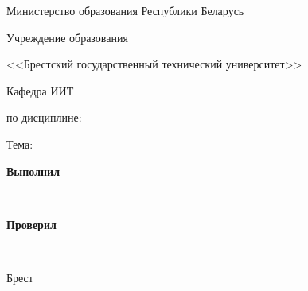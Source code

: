 \begin{center}
    Министерство образования Республики Беларусь

    Учреждение образования

    <<Брестский государственный технический университет>>

    Кафедра ИИТ
\end{center}

\vfill

\begin{center}
    \titlePageTypeWork

    по дисциплине: {\bfseries\titlePageSubject}

    Тема: \titlePageTopic
\end{center}

\vfill

\begin{flushright}
    \begin{minipage}[tl]{7cm}
        \textbf{Выполнил}

        \smallskip

        \titlePageStudentType

        \titlePageStudentSurname~\titlePageStudentName

        \bigskip

        \textbf{Проверил}

        \smallskip

        \titlePageTeacherSurname~\titlePageTeacherName
    \end{minipage}
\end{flushright}

\vfill

\begin{center}
    Брест~\the\year{}
\end{center}
